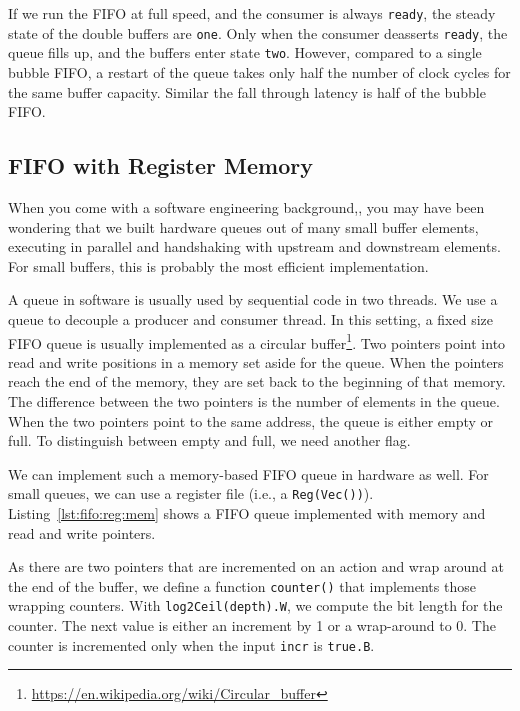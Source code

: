 \documentclass[%
    10pt,
    headinclude, footinclude=false,
    openright, %
    notitlepage,
    cleardoublepage=empty,
    headsepline,
    numbers=noenddot,
    bibliography=totoc, index=totoc,
    ]{scrbook}
\newcommand{\code}[1]{{\lstinline[basicstyle=\small\ttfamily]{#1}}}
\newcommand{\myref}[2]{\href{#1}{#2}}
\renewcommand{\myref}[2]{{#2}{\footnote{\url{#1}}}}
\begin{document}
If we run the FIFO at full speed, and the consumer is always \code{ready},
the steady state of the double buffers are \code{one}. Only when the consumer
deasserts \code{ready}, the queue fills up, and the buffers enter state \code{two}.
However, compared to a single bubble FIFO, a restart of the queue takes
only half the number of clock cycles for the same buffer capacity.
Similar the fall through latency is half of the bubble FIFO.

\subsection{FIFO with Register Memory}

When you come with a software engineering background,, you may have been
wondering that we built hardware queues out of many small buffer
elements, executing in parallel and handshaking with upstream and downstream
elements. For small buffers, this is probably the most efficient implementation.

A queue in software is usually used by sequential code in two threads.
We use a queue to decouple a producer and consumer thread.
In this setting, a fixed size FIFO queue is usually implemented as a
\myref{https://en.wikipedia.org/wiki/Circular_buffer}{circular buffer}.
Two pointers point into read and write positions in a memory set aside
for the queue. When the pointers reach the end of the memory, they
are set back to the beginning of that memory. The difference between the two
pointers is the number of elements in the queue. When the two pointers
point to the same address, the queue is either empty or full.
To distinguish between empty and full, we need another flag.

We can implement such a memory-based FIFO queue in hardware as
well. For small queues, we can use a register file (i.e., a \code{Reg(Vec())}).
Listing~\ref{lst:fifo:reg:mem} shows a FIFO queue implemented with memory
and read and write pointers.

\newpage
{}

As there are two pointers that are incremented on an
action and wrap around at the end of the buffer, we define a function \code{counter()}
that implements those wrapping counters. With \code{log2Ceil(depth).W}, we
compute the bit length for the counter. The next value is either an increment by
1 or a wrap-around to 0.
The counter is incremented only when the input \code{incr} is \code{true.B}.
\end{document}

